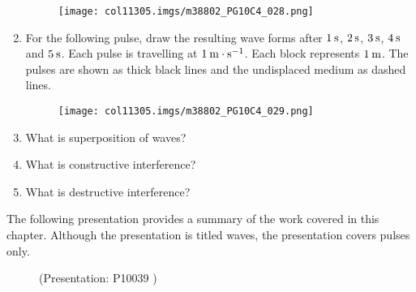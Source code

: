 \begin{enumerate}[noitemsep, label=\textbf{\arabic*}. ]
    \setcounter{subfigure}{0}
	\begin{figure}[H] %
    \begin{center}
    \label{m38802*id316530!!!underscore!!!media}\label{m38802*id316530!!!underscore!!!printimage}\texttt{[image: col11305.imgs/m38802\_PG10C4\_028.png]} %
      \vspace{2pt}
    \vspace{.1in}
    \end{center}
 \end{figure}               \label{m38802*uid61}\item For the following pulse, draw the resulting wave forms after $1\phantom{\rule{2pt}{0ex}}\mathrm{s}$, $2\phantom{\rule{2pt}{0ex}}\mathrm{s}$, $3\phantom{\rule{2pt}{0ex}}\mathrm{s}$, $4\phantom{\rule{2pt}{0ex}}\mathrm{s}$ and $5\phantom{\rule{2pt}{0ex}}\mathrm{s}$. Each pulse is travelling at $1\phantom{\rule{2pt}{0ex}}\mathrm{m}\ensuremath{\cdot}\mathrm{s}{}^{-1}$. Each block represents $1\phantom{\rule{2pt}{0ex}}\mathrm{m}$. The pulses are shown as thick black lines and the undisplaced medium as dashed lines.
    \setcounter{subfigure}{0}
	\begin{figure}[H] %
    \begin{center}
    \label{m38802*id316547!!!underscore!!!media}\label{m38802*id316547!!!underscore!!!printimage}\texttt{[image: col11305.imgs/m38802\_PG10C4\_029.png]} %
      \vspace{2pt}
    \vspace{.1in}
    \end{center}
 \end{figure}               \label{m38802*uid62}\item 
          What is superposition of waves?\newline
\label{m38802*uid64}\item What is constructive interference?\newline
\label{m38802*uid65}\item What is destructive interference?\newline
        \end{enumerate}
\label{m38802*fs-id1165499443114} The following presentation provides a summary of the work covered in this chapter. Although the presentation is titled waves, the presentation covers pulses only.
    \setcounter{subfigure}{0}
	\begin{figure}[H] %
    \label{m38802*slidesharemedia}\label{m38802*slideshareflash} { (Presentation:  P10039 )}
      \vspace{2pt}
    \vspace{.1in}
 \end{figure}       
